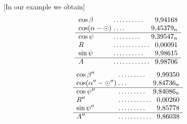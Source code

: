 [In our example we obtain]
\[
\begin{array}{l@{\;}l@{\;}r}
\cos\beta&\mathord{.}\,\mathord{.}\,\mathord{.}\,\mathord{.}\,\mathord{.}\,\mathord{.}\,\mathord{.}\,\mathord{.}\,\mathord{.}\,\mathord{.}&9{,}94168\\
\cos(\alpha-\odot)&\mathord{.}\,\mathord{.}\,\mathord{.}\,\mathord{.}&9{,}45379_n\\\hline
\cos\psi&\mathord{.}\,\mathord{.}\,\mathord{.}\,\mathord{.}\,\mathord{.}\,\mathord{.}\,\mathord{.}\,\mathord{.}\,\mathord{.}&9{,}39547_n\\
R&\mathord{.}\,\mathord{.}\,\mathord{.}\,\mathord{.}\,\mathord{.}\,\mathord{.}\,\mathord{.}\,\mathord{.}\,\mathord{.}\,\mathord{.}\,\mathord{.}\,\mathord{.}&0{,}00091\\
\sin\psi&\mathord{.}\,\mathord{.}\,\mathord{.}\,\mathord{.}\,\mathord{.}\,\mathord{.}\,\mathord{.}\,\mathord{.}\,\mathord{.}\,\mathord{.}&9{,}98615\\\hline
A&\mathord{.}\,\mathord{.}\,\mathord{.}\,\mathord{.}\,\mathord{.}\,\mathord{.}\,\mathord{.}\,\mathord{.}\,\mathord{.}\,\mathord{.}\,\mathord{.}\,\mathord{.}&9{,}98706
\end{array}
\]
\[
\begin{array}{l@{\;}l@{\;}r}
\cos\beta''&\mathord{.}\,\mathord{.}\,\mathord{.}\,\mathord{.}\,\mathord{.}\,\mathord{.}\,\mathord{.}\,\mathord{.}\,\mathord{.}&9{,}99350\\
\cos(\alpha''-\odot'')&\mathord{.}\,\mathord{.}\,\mathord{.}&9{,}84736_n\\\hline
\cos\psi''&\mathord{.}\,\mathord{.}\,\mathord{.}\,\mathord{.}\,\mathord{.}\,\mathord{.}\,\mathord{.}\,\mathord{.}\,\mathord{.}&9{,}84086_n\\
R''&\mathord{.}\,\mathord{.}\,\mathord{.}\,\mathord{.}\,\mathord{.}\,\mathord{.}\,\mathord{.}\,\mathord{.}\,\mathord{.}\,\mathord{.}\,\mathord{.}&0{,}00260\\
\sin\psi''&\mathord{.}\,\mathord{.}\,\mathord{.}\,\mathord{.}\,\mathord{.}\,\mathord{.}\,\mathord{.}\,\mathord{.}\,\mathord{.}&9{,}85778\\\hline
A''&\mathord{.}\,\mathord{.}\,\mathord{.}\,\mathord{.}\,\mathord{.}\,\mathord{.}\,\mathord{.}\,\mathord{.}\,\mathord{.}\,\mathord{.}\,\mathord{.}&9{,}86038
\end{array}
\]
